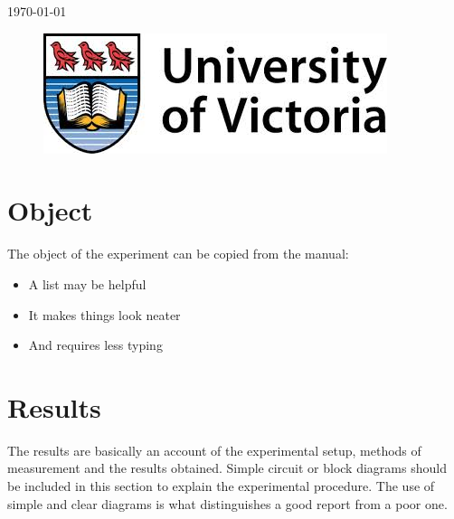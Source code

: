 \documentclass[12pt]{article}
\begin{document}
\begin{titlepage}
{\large \today}\\ %

\begin{figure}[b]	 %
	\centering
	\includegraphics[scale=0.3]{UVic_logo}
\end{figure}

\end{titlepage}


\tableofcontents
\pagebreak



\section{Object}\label{sec:object}
The object of the experiment can be copied from the manual:
\begin{itemize}
	\item A list may be helpful
	\item It makes things look neater
	\item And requires less typing
\end{itemize}

\section{Results}\label{sec:results}
The results are basically an account of the experimental setup, methods of measurement and the results obtained. Simple circuit or block diagrams should be included in this section to explain the experimental procedure. The use of simple and clear diagrams is what distinguishes a good report from a poor one.
\end{document}
